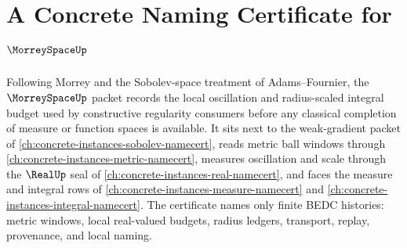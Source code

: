 \chapter{A Concrete Naming Certificate for $\MorreySpaceUp$}
\label{ch:concrete-instances-morrey-space-namecert}

Following Morrey and the Sobolev-space treatment of Adams--Fournier, the $\MorreySpaceUp$ packet records the local oscillation and radius-scaled integral budget used by constructive regularity consumers before any classical completion of measure or function spaces is available. It sits next to the weak-gradient packet of \autoref{ch:concrete-instances-sobolev-namecert}, reads metric ball windows through \autoref{ch:concrete-instances-metric-namecert}, measures oscillation and scale through the $\RealUp$ seal of \autoref{ch:concrete-instances-real-namecert}, and faces the measure and integral rows of \autoref{ch:concrete-instances-measure-namecert} and \autoref{ch:concrete-instances-integral-namecert}. The certificate names only finite BEDC histories: metric windows, local real-valued budgets, radius ledgers, transport, replay, provenance, and local naming.


